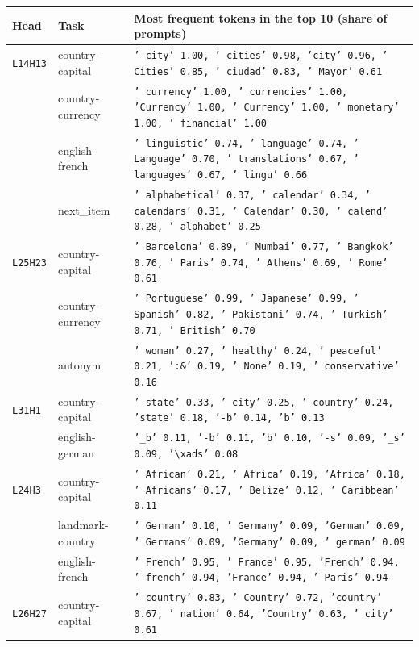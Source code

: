 \begin{table}[tbp]
\centering\small
\begin{tabularx}{\textwidth}{@{}llL@{}}
\toprule
Head & Task & Most frequent tokens in the top 10 (share of prompts) \\
\midrule
\texttt{L14H13} & country-capital & \texttt{\small ' city' 1.00, ' cities' 0.98, 'city' 0.96, ' Cities' 0.85, ' ciudad' 0.83, ' Mayor' 0.61} \\
\texttt{} & country-currency & \texttt{\small ' currency' 1.00, ' currencies' 1.00, 'Currency' 1.00, ' Currency' 1.00, ' monetary' 1.00, ' financial' 1.00} \\
\texttt{} & english-french & \texttt{\small ' linguistic' 0.74, ' language' 0.74, ' Language' 0.70, ' translations' 0.67, ' languages' 0.67, ' lingu' 0.66} \\
\texttt{} & next\_item & \texttt{\small ' alphabetical' 0.37, ' calendar' 0.34, ' calendars' 0.31, ' Calendar' 0.30, ' calend' 0.28, ' alphabet' 0.25} \\
\texttt{L25H23} & country-capital & \texttt{\small ' Barcelona' 0.89, ' Mumbai' 0.77, ' Bangkok' 0.76, ' Paris' 0.74, ' Athens' 0.69, ' Rome' 0.61} \\
\texttt{} & country-currency & \texttt{\small ' Portuguese' 0.99, ' Japanese' 0.99, ' Spanish' 0.82, ' Pakistani' 0.74, ' Turkish' 0.71, ' British' 0.70} \\
\texttt{} & antonym & \texttt{\small ' woman' 0.27, ' healthy' 0.24, ' peaceful' 0.21, ':\&' 0.19, ' None' 0.19, ' conservative' 0.16} \\
\texttt{L31H1} & country-capital & \texttt{\small ' state' 0.33, ' city' 0.25, ' country' 0.24, 'state' 0.18, '-b' 0.14, 'b' 0.13} \\
\texttt{} & english-german & \texttt{\small '\_b' 0.11, '-b' 0.11, 'b' 0.10, '-s' 0.09, '\_s' 0.09, '\textbackslash{}xads' 0.08} \\
\texttt{L24H3} & country-capital & \texttt{\small ' African' 0.21, ' Africa' 0.19, 'Africa' 0.18, ' Africans' 0.17, ' Belize' 0.12, ' Caribbean' 0.11} \\
\texttt{} & landmark-country & \texttt{\small ' German' 0.10, ' Germany' 0.09, 'German' 0.09, ' Germans' 0.09, 'Germany' 0.09, ' german' 0.09} \\
\texttt{} & english-french & \texttt{\small ' French' 0.95, ' France' 0.95, 'French' 0.94, ' french' 0.94, 'France' 0.94, ' Paris' 0.94} \\
\texttt{L26H27} & country-capital & \texttt{\small ' country' 0.83, ' Country' 0.72, 'country' 0.67, ' nation' 0.64, 'Country' 0.63, ' city' 0.61} \\

\end{tabularx}
\end{table}
